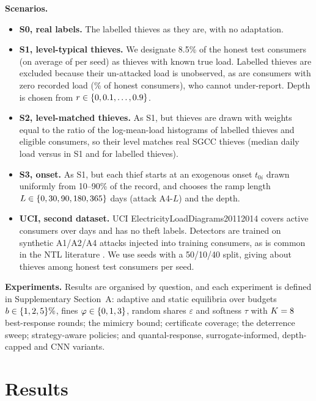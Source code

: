 \documentclass[journal]{IEEEtran}
\begin{document}
\textbf{Scenarios.}
\begin{itemize}
\item \textbf{S0, real labels.} The labelled thieves as they are, with no adaptation.
\item \textbf{S1, level-typical thieves.} We designate 8.5\% of the honest test consumers (on average \rNSOneThieves{} of \rNTestHonest{} per seed) as thieves with known true load. Labelled thieves are excluded because their un-attacked load is unobserved, as are consumers with zero recorded load (\rZeroLoadHonest\% of honest consumers), who cannot under-report. Depth is chosen from $r\in\{0,0.1,\dots,0.9\}$.
\item \textbf{S2, level-matched thieves.} As S1, but thieves are drawn with weights equal to the ratio of the log-mean-load histograms of labelled thieves and eligible consumers, so their level matches real SGCC thieves (median daily load \rMedLoadSTwo{} versus \rMedLoadSOne{} in S1 and \rMedLoadThief{} for labelled thieves).
\item \textbf{S3, onset.} As S1, but each thief starts at an exogenous onset $t_{0i}$ drawn uniformly from 10--90\% of the record, and chooses the ramp length $L\in\{0, 30, 90, 180, 365\}$ days (attack A4-$L$) and the depth.
\item \textbf{UCI, second dataset.} UCI ElectricityLoadDiagrams20112014 \cite{trindade2015} covers \rUciN{} active consumers over \rUciDays{} days and has no theft labels. Detectors are trained on synthetic A1/A2/A4 attacks injected into training consumers, as is common in the NTL literature \cite{jokar2016}. We use \rUciSeeds{} seeds with a 50/10/40 split, giving about \rUciThieves{} thieves among \rUciTestHonest{} honest test consumers per seed.
\end{itemize}

\textbf{Experiments.} Results are organised by question, and each experiment is defined in Supplementary Section~A: adaptive and static equilibria over budgets $b\in\{1, 2, 5\}\%$, fines $\varphi\in\{0, 1, 3\}$, random shares $\varepsilon$ and softness $\tau$ with $K=8$ best-response rounds; the mimicry bound; certificate coverage; the deterrence sweep; strategy-aware policies; and quantal-response, surrogate-informed, depth-capped and CNN variants.

\section{Results}\label{sec:results}
\end{document}
